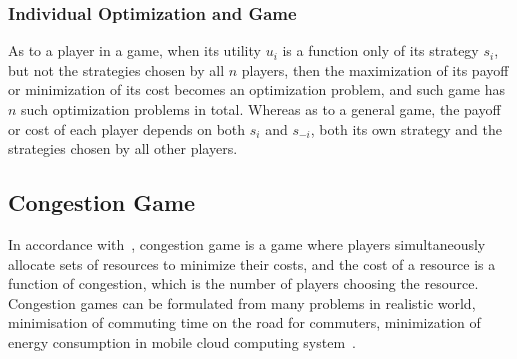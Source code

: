 

\subsubsection*{Individual Optimization and Game}
As to a player in a game, when its utility $u_i$ is a function only of its strategy $s_i$, but not the strategies chosen by all $n$ players, then the maximization of its payoff or minimization of its cost becomes an optimization problem, and such game has $n$ such optimization problems in total.
Whereas as to a general game, the payoff or cost of each player depends on both $s_i$ and $s_{-i}$, both its own strategy and the strategies chosen by all other players.






\subsection{Congestion Game}
In accordance with~\cite{Voecking06congestiongames}, congestion game is a game where players simultaneously allocate sets of resources to minimize their costs, and the cost of a resource is a function of congestion, which is the number of players choosing the resource.
Congestion games can be formulated from many problems in realistic world, \eg minimisation of commuting time on the road for commuters, minimization of energy consumption in mobile cloud computing system~\cite{game_cloudcomputing_energy12}.






